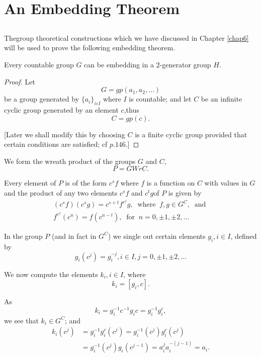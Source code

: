 
\chapter{An Embedding Theorem}\label{chap8}%

\section{}\label{chap8:sec1}%

The\pageoriginale group theoretical constructions which we have
discussed in Chapter \ref{chap6} will be used to prove the following
embedding theorem.  

\setcounter{theorem}{0}
\begin{theorem}\label{chap8:sec1:thm1}%
  Every countable group $G$ can be embedding in a $2$-generator group $H$.
\end{theorem}

\begin{proof}
  Let
  $$
  G = gp (a_1,a_2, \ldots)
  $$
  be a group generated by $\{ a_i\}_{i \varepsilon I}$ where $I$ is
  countable; and let $C$ be an infinite cyclic group generated by an
  element $c$,thus 
  $$
  C= gp (c).
  $$
  
  [Later we shall modify this by choosing $C$ is a finite cyclic group
    provided that certain conditions are satisfied; cf $p. 146$.] 
\end{proof}

We form the wreath product of the groups $G$ and $C$, 
$$
P= G Wr C.
$$

Every element of $P$ is of the form $c^s f$ where $f$ is a function on
$C$ with values in $G$ and the product of any two elements $c^sf$ and
$c^tg$\pageoriginale of $P$ is given by 
\begin{multline*}
  (c^s f) (c^s g) = c^{s+t} f^c{^{^t}}g, ~\text{ where }~ f, g \in
  G^C, ~\text{ and }\\
  f^c{^{^t}} (c^n) = f (c^{n-t}), ~\text{ for }~ n =0,
  \pm 1, \pm 2,\ldots 
\end{multline*}

In the group $P$ (and in fact in $G^C$) we single out certain elements
$g_i, i \in I$, defined by 
$$
g_i (c^j) = g^{-j}_i, i \in I, j=0, \pm 1, \pm 2, \ldots
$$

We now compute the elements $k_i, i \in I$, where
$$
k_i = [g_i,c].
$$

As
$$
k_i = g^{-1}_i c^{-1} g_i c = g_i^{-1} g^c_i,
$$
we see that $k_i \in G^C$; and
\begin{align*}
  k_i (c^j) &= g^{-1}_i g^c_i (c^j) = g_i^{-1} (c^j) g^c_i (c^j)\\
  & = g^{-1}_i (c^j) g_i (c^{j-1}) = a_i^j a^{-(j-1)}_i  = a_i.
\end{align*}

